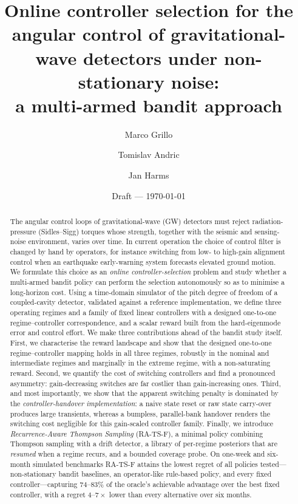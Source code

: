 \documentclass[11pt,a4paper]{article}
\title{\bfseries Online controller selection for the angular control of
gravitational-wave detectors under non-stationary noise:\\
a multi-armed bandit approach}
\author[1]{Marco Grillo}
\author[1,2]{Tomislav Andric}
\author[1,2]{Jan Harms}
\affil[1]{Gran Sasso Science Institute (GSSI), I-67100 L'Aquila, Italy}
\affil[2]{INFN, Laboratori Nazionali del Gran Sasso, I-67100 Assergi, Italy}
\date{Draft --- \today}
\begin{document}
\maketitle

\begin{abstract}
The angular control loops of gravitational-wave (GW) detectors must reject
radiation-pressure (Sidles--Sigg) torques whose strength, together with the
seismic and sensing-noise environment, varies over time. In current operation
the choice of control filter is changed by hand by operators, for instance
switching from low- to high-gain alignment control when an earthquake
early-warning system forecasts elevated ground motion. We formulate this
choice as an \emph{online controller-selection} problem and study whether a
multi-armed bandit policy can perform the selection autonomously so as to
minimise a long-horizon cost. Using a time-domain simulator of the pitch
degree of freedom of a coupled-cavity detector, validated against a reference
implementation, we define three operating regimes and a family of fixed linear
controllers with a designed one-to-one regime--controller correspondence, and
a scalar reward built from the hard-eigenmode error and control effort. We make
three contributions ahead of the bandit study itself. First, we characterise
the reward landscape and show that the designed one-to-one regime--controller
mapping holds in all three regimes, robustly in the nominal and intermediate
regimes and marginally in the extreme regime, with a non-saturating reward.
Second, we
quantify the cost of switching controllers and find a pronounced asymmetry:
gain-decreasing switches are far costlier than gain-increasing ones. Third, and
most importantly, we show that the apparent switching penalty is dominated by
the \emph{controller-handover implementation}: a naive state reset or raw
state carry-over produces large transients, whereas a bumpless, parallel-bank
handover renders the switching cost negligible for this gain-scaled controller
family. Finally, we introduce \emph{Recurrence-Aware Thompson Sampling}
(RA-TS-F), a minimal policy combining Thompson sampling with a drift detector, a
library of per-regime posteriors that are \emph{resumed} when a regime recurs,
and a bounded coverage probe. On one-week and six-month simulated benchmarks
RA-TS-F attains the lowest regret of all policies tested---non-stationary
bandit baselines, an operator-like rule-based policy, and every fixed
controller---capturing $74$--$83\%$ of the oracle's achievable advantage over
the best fixed controller, with a regret $4$--$7\times$ lower than every
alternative over six months.
\end{abstract}
\end{document}
